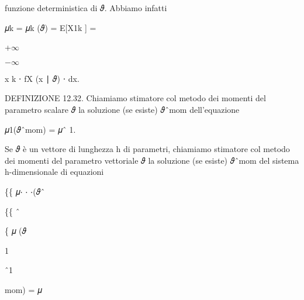 \documentclass[a4paper,portrait,12pt]{article}
\begin{document}
\begin{flushleft}
funzione deterministica di 𝜗. Abbiamo infatti
\end{flushleft}


\begin{flushleft}
𝜇k = 𝜇k (𝜗) = E[X1k ] =
\end{flushleft}





+$\infty$


$-$$\infty$





\begin{flushleft}
x k ⋅ fX (x ∣ 𝜗) ⋅ dx.
\end{flushleft}





\begin{flushleft}
DEFINIZIONE 12.32. Chiamiamo stimatore col metodo dei momenti del parametro scalare 𝜗 la soluzione (se esiste) 𝜗ˆmom dell'equazione
\end{flushleft}


\begin{flushleft}
𝜇1(𝜗ˆmom) = 𝜇ˆ 1.
\end{flushleft}


\begin{flushleft}
Se 𝜗 \`{e} un vettore di lunghezza h di parametri, chiamiamo stimatore col metodo dei momenti del parametro vettoriale 𝜗 la soluzione (se esiste) 𝜗ˆmom del sistema h-dimensionale di equazioni
\end{flushleft}





\begin{flushleft}
\{\{ 𝜇⋅ ⋅ ⋅(𝜗ˆ
\end{flushleft}


\{\{ ˆ


\begin{flushleft}
\{ 𝜇 (𝜗
\end{flushleft}


1





ˆ1


\begin{flushleft}
mom) = 𝜇
\end{flushleft}
\end{document}
